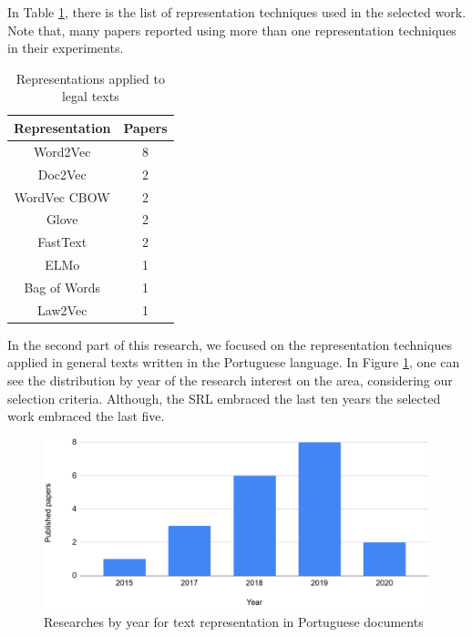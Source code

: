 In Table \ref{tab:rsl_representation_legal}, there is the list of representation techniques used in the selected work. Note that, many papers reported using more than one representation techniques in their experiments.

\begin{table}[htb]
\centering
\caption{Representations applied to legal texts}
\label{tab:rsl_representation_legal}
\footnotesize
\begin{tabular}{cc}
\hline
\textbf{Representation} & \textbf{Papers} \\ \hline
Word2Vec                & 8               \\
Doc2Vec                 & 2               \\
WordVec CBOW           & 2               \\
Glove                   & 2               \\
FastText                & 2               \\
ELMo                    & 1               \\
Bag of Words            & 1               \\
Law2Vec                 & 1              \\\bottomrule
\end{tabular}
\end{table}

In the second part of this research, we focused on the representation techniques applied in general texts written in the Portuguese language. In Figure \ref{fig:rsl_representation_portuguese_year}, one can see the distribution by year of the research interest on the area, considering our selection criteria. Although, the SRL embraced the last ten years the selected work embraced the last five.


\begin{figure}[htb]
    \centering
    \caption{Researches by year for text representation in Portuguese documents}
    \label{fig:rsl_representation_portuguese_year}
    \includegraphics[width=\textwidth]{images/appendix/rsl_portuguese_representation.png}
\end{figure}

